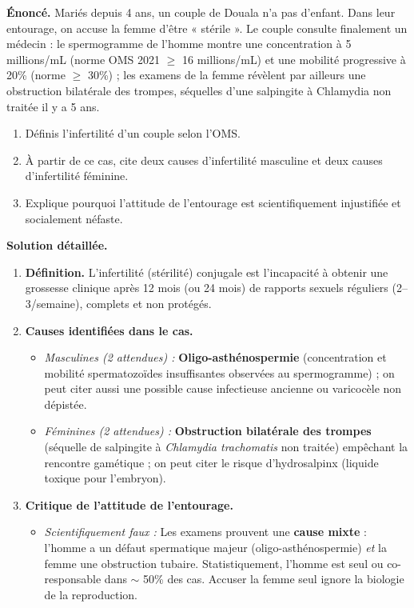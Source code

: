 \documentclass[11pt]{article}
\begin{document}
\begin{exoresolu}
\textbf{Énoncé.} Mariés depuis 4 ans, un couple de Douala n'a pas d'enfant. Dans leur entourage, on accuse la femme d'être « stérile ». Le couple consulte finalement un médecin : le spermogramme de l'homme montre une concentration à 5 millions/mL (norme OMS 2021 $\ge$ 16 millions/mL) et une mobilité progressive à 20\% (norme $\ge$ 30\%) ; les examens de la femme révèlent par ailleurs une obstruction bilatérale des trompes, séquelles d'une salpingite à Chlamydia non traitée il y a 5 ans.
\begin{enumerate}
\item Définis l'infertilité d'un couple selon l'OMS.
\item À partir de ce cas, cite deux causes d'infertilité masculine et deux causes d'infertilité féminine.
\item Explique pourquoi l'attitude de l'entourage est scientifiquement injustifiée et socialement néfaste.
\end{enumerate}
\tcblower
\textbf{Solution détaillée.}
\begin{enumerate}
\item \textbf{Définition.} L'infertilité (stérilité) conjugale est l'incapacité à obtenir une grossesse clinique après 12 mois (ou 24 mois) de rapports sexuels réguliers (2--3/semaine), complets et non protégés.
\item \textbf{Causes identifiées dans le cas.}
\begin{itemize}
\item \emph{Masculines (2 attendues) :} \textbf{Oligo-asthénospermie} (concentration et mobilité spermatozoïdes insuffisantes observées au spermogramme) ; on peut citer aussi une possible cause infectieuse ancienne ou varicocèle non dépistée.
\item \emph{Féminines (2 attendues) :} \textbf{Obstruction bilatérale des trompes} (séquelle de salpingite à \emph{Chlamydia trachomatis} non traitée) empêchant la rencontre gamétique ; on peut citer le risque d'hydrosalpinx (liquide toxique pour l'embryon).
\end{itemize}
\item \textbf{Critique de l'attitude de l'entourage.}
\begin{itemize}
\item \emph{Scientifiquement faux :} Les examens prouvent une \textbf{cause mixte} : l'homme a un défaut spermatique majeur (oligo-asthénospermie) \emph{et} la femme une obstruction tubaire. Statistiquement, l'homme est seul ou co-responsable dans $\sim$ 50\% des cas. Accuser la femme seul ignore la biologie de la reproduction.

\end{itemize}
\end{enumerate}
\end{exoresolu}
\end{document}
